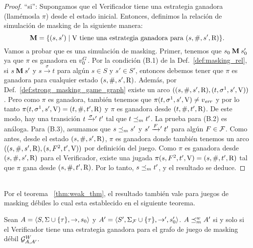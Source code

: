 \begin{proof}
``si'': Supongamos que el Verificador tiene una estrategia ganadora (llamémosla $\pi$) 
desde el estado inicial. Entonces, definimos la relación de simulación de masking de la siguiente manera: 
\[
\mathbin{\mathbf{M}} = \{(s,s') \mid \mathrm{V} \text{ tiene una estrategia ganadora para } (s, \#, s', \mathrm{R}) \}.
\]
Vamos a probar que es una simulación de masking. 
Primer, tenemos que $s_0 \mathbin{\mathbf{M}} s'_0$ ya que $\pi$ es ganadora en $v_0^G$. Por la condición (B.1) de la Def.~\ref{def:masking_rel}, si
$s \mathbin{\mathbf{M}} s'$ y $s \xrightarrow{\sigma} t$ para algún $s \in S$ y $s' \in S'$, entonces debemos tener que $\pi$ es ganadora para cualquier estado $(s,\#,s',\mathrm{R})$. Además, por Def.~\ref{def:strong_masking_game_graph} existe un arco 
$((s,\#,s',\mathrm{R}), (t,\sigma^1,s',\mathrm{V}))$. 
Pero como $\pi$ es ganadora, también tenemos que $\pi(t,\sigma^1,s',\mathrm{V}) \neq v_{\mathit{err}}$ y 
por lo tanto $\pi(t,\sigma^1,s',\mathrm{V})=(t, \#, t', \mathrm{R})$ y $\pi$ es ganadora desde  $(t, \#, t', \mathrm{R})$.
De este modo, hay una transición $t \mathrel{{\xrightarrow[]{\sigma}}{}'} t'$ tal que
$t \preceq_{m} t'$. La prueba para (B.2) es análoga. Para (B.3), asumamos que $s \preceq_{m} s'$ y $s' \mathrel{{\xrightarrow[]{F}}{}'} t'$ para algún 
$F \in \mathcal{F}$. 
Como antes, desde el estado $(s,\#,s',\mathrm{R})$, $\pi$ es ganadora donde también tenemos un arco $((s,\#,s',\mathrm{R}), (s,F^2,t',\mathrm{V}))$ por definición del juego. 
Como $\pi$ es ganadora desde $(s,\#,s',\mathrm{R})$ para el Verificador, existe una jugada $\pi(s,F^2,t',\mathrm{V}) = (s,\#,t',\mathrm{R})$ tal que $\pi$ gana desde 
$(s,\#,t',\mathrm{R})$. Por lo tanto, $s \preceq_{m} t'$, y el resultado se deduce.
\qedhere

\end{proof} \\

Por el teorema ~\ref{thm:weak_thm}, el resultado también vale para juegos de masking débiles lo cual esta establecido en el siguiente teorema.

\begin{theorem} \label{thm:weak_wingame_strat}
  Sean $A=\langle S, \Sigma \cup \{\tau\}, \rightarrow, s_0 \rangle$ y
  $A'=\langle S', \Sigma_{\mathcal{F}} \cup \{\tau\}, \rightarrow', s'_0 \rangle$.
  $A \preceq^w_{m} A'$ si y solo si el Verificador tiene una estrategia ganadora para el grafo de juego de masking débil $\mathcal{G}^W_{A,A'}$.
\end{theorem}

